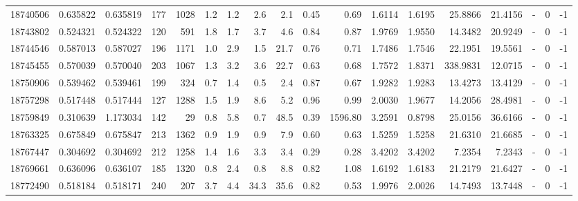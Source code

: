 \begin{tabular}{rrrrrrrrrrrrrrrlrr}
  18740506 & 0.635822 &   0.635819 &  177 & 1028 &      1.2 &      1.2 &     2.6 &      2.1 &       0.45 &        0.69 &  1.6114 &  1.6195 &   25.8866 &   21.4156 &             - &        0 &         -1 \\
  18743802 & 0.524321 &   0.524322 &  120 &  591 &      1.8 &      1.7 &     3.7 &      4.6 &       0.84 &        0.87 &  1.9769 &  1.9550 &   14.3482 &   20.9249 &             - &        0 &         -1 \\
  18744546 & 0.587013 &   0.587027 &  196 & 1171 &      1.0 &      2.9 &     1.5 &     21.7 &       0.76 &        0.71 &  1.7486 &  1.7546 &   22.1951 &   19.5561 &             - &        0 &         -1 \\
  18745455 & 0.570039 &   0.570040 &  203 & 1067 &      1.3 &      3.2 &     3.6 &     22.7 &       0.63 &        0.68 &  1.7572 &  1.8371 &  338.9831 &   12.0715 &             - &        0 &         -1 \\
  18750906 & 0.539462 &   0.539461 &  199 &  324 &      0.7 &      1.4 &     0.5 &      2.4 &       0.87 &        0.67 &  1.9282 &  1.9283 &   13.4273 &   13.4129 &             - &        0 &         -1 \\
  18757298 & 0.517448 &   0.517444 &  127 & 1288 &      1.5 &      1.9 &     8.6 &      5.2 &       0.96 &        0.99 &  2.0030 &  1.9677 &   14.2056 &   28.4981 &             - &        0 &         -1 \\
  18759849 & 0.310639 &   1.173034 &  142 &   29 &      0.8 &      5.8 &     0.7 &     48.5 &       0.39 &     1596.80 &  3.2591 &  0.8798 &   25.0156 &   36.6166 &             - &        0 &         -1 \\
  18763325 & 0.675849 &   0.675847 &  213 & 1362 &      0.9 &      1.9 &     0.9 &      7.9 &       0.60 &        0.63 &  1.5259 &  1.5258 &   21.6310 &   21.6685 &             - &        0 &         -1 \\
  18767447 & 0.304692 &   0.304692 &  212 & 1258 &      1.4 &      1.6 &     3.3 &      3.4 &       0.29 &        0.28 &  3.4202 &  3.4202 &    7.2354 &    7.2343 &             - &        0 &         -1 \\
  18769661 & 0.636096 &   0.636107 &  185 & 1320 &      0.8 &      2.4 &     0.8 &      8.8 &       0.82 &        1.08 &  1.6192 &  1.6183 &   21.2179 &   21.6427 &             - &        0 &         -1 \\
  18772490 & 0.518184 &   0.518171 &  240 &  207 &      3.7 &      4.4 &    34.3 &     35.6 &       0.82 &        0.53 &  1.9976 &  2.0026 &   14.7493 &   13.7448 &             - &        0 &         -1 \\

\end{tabular}
